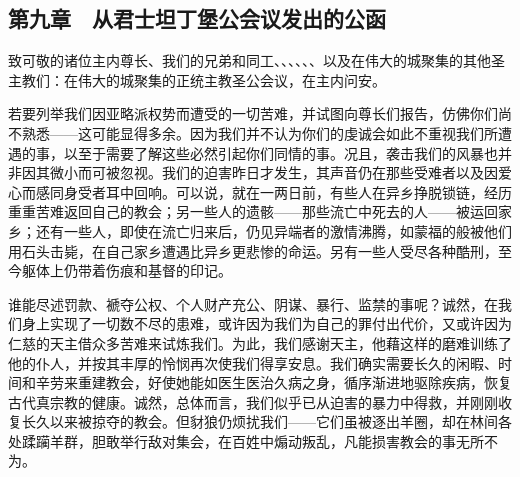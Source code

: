
\subsection{第九章　从君士坦丁堡公会议发出的公函}

致可敬的诸位主内尊长、我们的兄弟和同工、、、、、、以及在伟大的城聚集的其他圣主教们：在伟大的城聚集的正统主教圣公会议，在主内问安。\par

若要列举我们因亚略派权势而遭受的一切苦难，并试图向尊长们报告，仿佛你们尚不熟悉——这可能显得多余。因为我们并不认为你们的虔诚会如此不重视我们所遭遇的事，以至于需要了解这些必然引起你们同情的事。况且，袭击我们的风暴也并非因其微小而可被忽视。我们的迫害昨日才发生，其声音仍在那些受难者以及因爱心而感同身受者耳中回响。可以说，就在一两日前，有些人在异乡挣脱锁链，经历重重苦难返回自己的教会；另一些人的遗骸——那些流亡中死去的人——被运回家乡；还有一些人，即使在流亡归来后，仍见异端者的激情沸腾，如蒙福的般被他们用石头击毙，在自己家乡遭遇比异乡更悲惨的命运。另有一些人受尽各种酷刑，至今躯体上仍带着伤痕和基督的印记。\par

谁能尽述罚款、褫夺公权、个人财产充公、阴谋、暴行、监禁的事呢？诚然，在我们身上实现了一切数不尽的患难，或许因为我们为自己的罪付出代价，又或许因为仁慈的天主借众多苦难来试炼我们。为此，我们感谢天主，他藉这样的磨难训练了他的仆人，并按其丰厚的怜悯再次使我们得享安息。我们确实需要长久的闲暇、时间和辛劳来重建教会，好使她能如医生医治久病之身，循序渐进地驱除疾病，恢复古代真宗教的健康。诚然，总体而言，我们似乎已从迫害的暴力中得救，并刚刚收复长久以来被掠夺的教会。但豺狼仍烦扰我们——它们虽被逐出羊圈，却在林间各处蹂躏羊群，胆敢举行敌对集会，在百姓中煽动叛乱，凡能损害教会的事无所不为。\par

